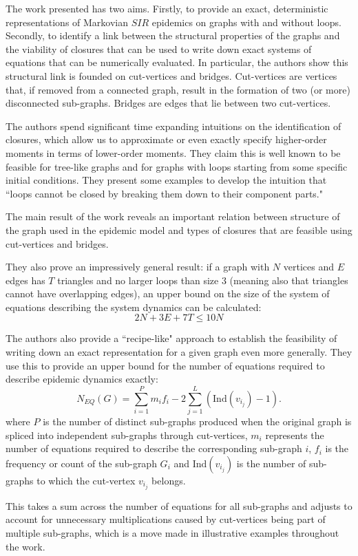 \documentclass[../report.tex]{subfiles}
\begin{document}
The work presented has two aims. Firstly, to provide an exact, deterministic representations of Markovian $SIR$ epidemics on graphs with and without loops. Secondly, to identify a link between the structural properties of the graphs and the viability of closures that can be used to write down exact systems of equations that can be numerically evaluated. In particular, the authors show this structural link is founded on cut-vertices and bridges. Cut-vertices are vertices that, if removed from a connected graph, result in the formation of two (or more) disconnected sub-graphs. Bridges are edges that lie between two cut-vertices.

The authors spend significant time expanding intuitions on the identification of closures, which allow us to approximate or even exactly specify higher-order moments in terms of lower-order moments. They claim this is well known to be feasible for tree-like graphs and for graphs with loops starting from some specific initial conditions. They present some examples to develop the intuition that ``loops cannot be closed by breaking them down to their component parts."

The main result of the work reveals an important relation between structure of the graph used in the epidemic model and types of closures that are feasible using cut-vertices and bridges.

They also prove an impressively general result: if a graph with $N$ vertices and  $E$ edges has $T$ triangles and no larger loops than size 3 (meaning also that triangles cannot have overlapping edges), an upper bound on the size of the system of equations describing the system dynamics can be calculated:
$$
2N + 3E + 7T \leq 10N
$$

The authors also provide a ``recipe-like" approach to establish the feasibility of writing down an exact representation for a given graph even more generally. They use this to provide an upper bound for the number of equations required to describe epidemic dynamics exactly:
$$
\displaystyle N_{EQ}(G)=\sum^P_{i=1}m_if_i - 2\sum^{L}_{j=1}(\text{Ind}(v_{i_j})-1).
$$
where $P$ is the number of distinct sub-graphs produced when the original graph is spliced into independent sub-graphs through cut-vertices, $m_i$ represents the number of equations required to describe the corresponding sub-graph $i$, $f_i$ is the frequency or count of the sub-graph $G_i$ and $\text{Ind}(v_{i_j})$ is the number of sub-graphs to which the cut-vertex $v_{i_j}$ belongs.

This takes a sum across the number of equations for all sub-graphs and adjusts to account for unnecessary multiplications caused by cut-vertices being part of multiple sub-graphs, which is a move made in illustrative examples throughout the work.
\end{document}

